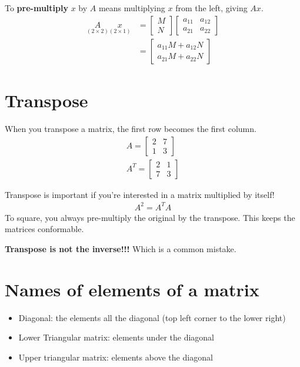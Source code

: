 \documentclass[12pt]{article}
\begin{document}
To \textbf{pre-multiply} $x$ by $A$ means multiplying $x$ from the left, giving $Ax$. 
\begin{align}
    \underset{(2 \times 2)}{A} \underset{(2 \times 1)}{x} &= \begin{bmatrix}
            M \\
            N
        \end{bmatrix} 
        \begin{bmatrix}
            a_{11} & a_{12} \\
            a_{21} & a_{22}
        \end{bmatrix} \\
       &= \begin{bmatrix}
           a_{11} M + a_{12}N \\
           a_{21}M + a_{22}N
       \end{bmatrix} 
\end{align}


\section{Transpose}
When you transpose a matrix, the first row becomes the first column. 
\begin{align}
    A = \begin{bmatrix}
        2 & 7 \\
        1 & 3
    \end{bmatrix}\\
    A^{T} = \begin{bmatrix}
        2 & 1 \\
        7 & 3
    \end{bmatrix}
\end{align}

Transpose is important if you're interested in a matrix multiplied by itself! 
\begin{align}
    A^2 = A^{T}A 
\end{align}
To square, you always pre-multiply the original by the transpose. This keeps the matrices conformable. 

\textbf{Transpose is not the inverse!!! } Which is a common mistake. 


\section{Names of elements of a matrix}
\begin{itemize}
    \item Diagonal: the elements all the diagonal (top left corner to the lower right)
    \item Lower Triangular matrix: elements under the diagonal 
    \item Upper triangular matrix: elements above the diagonal
\end{itemize}
\end{document}
